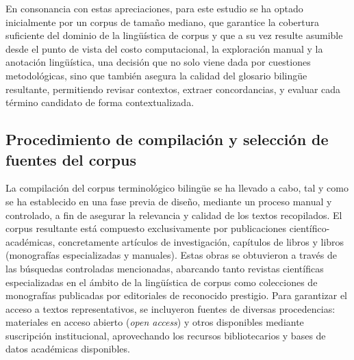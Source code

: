En consonancia con estas apreciaciones, para este estudio se ha optado inicialmente por un corpus de tamaño mediano, que garantice la cobertura suficiente del dominio de la lingüística de corpus y que a su vez resulte asumible desde el punto de vista del costo computacional, la exploración manual y la anotación lingüística, una decisión que no solo viene dada por cuestiones metodológicas, sino que también asegura la calidad del glosario bilingüe resultante, permitiendo revisar contextos, extraer concordancias, y evaluar cada término candidato de forma contextualizada.


\subsection{Procedimiento de compilación y selección de fuentes del corpus} \label{construccion}

La compilación del corpus terminológico bilingüe se ha llevado a cabo, tal y como se ha establecido en una fase previa de diseño, mediante un proceso manual y controlado, a fin de asegurar la relevancia y calidad de los textos recopilados. El corpus resultante está compuesto exclusivamente por publicaciones científico-académicas, concretamente artículos de investigación, capítulos de libros y libros (monografías especializadas y manuales). Estas obras se obtuvieron a través de las búsquedas controladas mencionadas, abarcando tanto revistas científicas especializadas en el ámbito de la lingüística de corpus como colecciones de monografías publicadas por editoriales de reconocido prestigio. Para garantizar el acceso a textos representativos, se incluyeron fuentes de diversas procedencias: materiales en acceso abierto (\textit{open access}) y otros disponibles mediante suscripción institucional, aprovechando los recursos bibliotecarios y bases de datos académicas disponibles.

